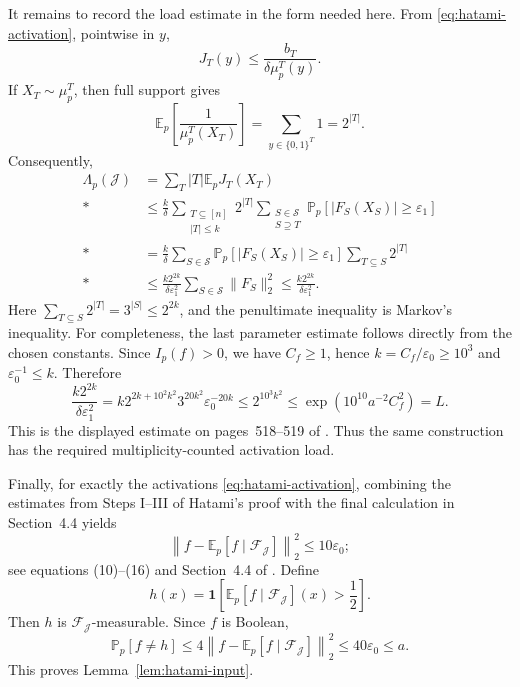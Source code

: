 \documentclass[11pt,letterpaper]{article}
\theoremstyle{definition}
\theoremstyle{remark}
\newcommand{\bits}{\{0,1\}}
\newcommand{\E}{\mathbb E}
\renewcommand{\Pr}{\mathbb P}
\newcommand{\one}{\mathbf 1}
\newcommand{\cF}{\mathcal F}
\newcommand{\cJ}{\mathcal J}
\newcommand{\cS}{\mathcal S}
\begin{document}
It remains to record the load estimate in the form needed here.  From
\eqref{eq:hatami-activation}, pointwise in $y$,
\[
       J_T(y)\le\frac{b_T}{\delta\mu_p^T(y)}.
\]
If $X_T\sim\mu_p^T$, then full support gives
\[
       \E_p\left[\frac1{\mu_p^T(X_T)}\right]
       =\sum_{y\in\bits^T}1=2^{|T|}.
\]
Consequently,
\begin{align*}
 \Lambda_p(\cJ)
 &=\sum_T |T|\E_pJ_T(X_T)\\*
 &\le \frac{k}{\delta}
      \sum_{\substack{T\subseteq[n]\\|T|\le k}}2^{|T|}
      \sum_{\substack{S\in\cS\\S\supseteq T}}
      \Pr_p[|F_S(X_S)|\ge\varepsilon_1]\\*
 &=\frac{k}{\delta}
      \sum_{S\in\cS}\Pr_p[|F_S(X_S)|\ge\varepsilon_1]
      \sum_{T\subseteq S}2^{|T|}\\*
 &\le\frac{k2^{2k}}{\delta\varepsilon_1^2}
      \sum_{S\in\cS}\|F_S\|_2^2
 \le\frac{k2^{2k}}{\delta\varepsilon_1^2}.
\end{align*}
Here $\sum_{T\subseteq S}2^{|T|}=3^{|S|}\le2^{2k}$, and the penultimate
inequality is Markov's inequality.  For completeness, the last parameter estimate follows directly from the
chosen constants.  Since $I_p(f)>0$, we have $C_f\ge1$, hence
$k=C_f/\varepsilon_0\ge10^3$ and $\varepsilon_0^{-1}\le k$.  Therefore
\[
 \frac{k2^{2k}}{\delta\varepsilon_1^2}
 =k2^{2k+10^2k^2}3^{20k^2}\varepsilon_0^{-20k}
 \le2^{10^3k^2}
 \le\exp\!\left(10^{10}a^{-2}C_f^2\right)=L.
\]
This is the displayed estimate on pages~518--519 of \cite{Hatami2012}.
Thus the same construction has the required multiplicity-counted activation
load.

Finally, for exactly the activations \eqref{eq:hatami-activation}, combining
the estimates from Steps I--III of Hatami's proof with the final calculation in
Section~4.4 yields
\[
       \left\|f-\E_p[f\mid\cF_{\cJ}]\right\|_2^2
       \le10\varepsilon_0;
\]
see equations (10)--(16) and Section~4.4 of \cite{Hatami2012}.  Define
\[
       h(x)=\one\!\left[
          \E_p[f\mid\cF_{\cJ}](x)>\frac12
       \right].
\]
Then $h$ is $\cF_{\cJ}$-measurable.  Since $f$ is Boolean,
\[
       \Pr_p[f\ne h]
       \le4\left\|f-\E_p[f\mid\cF_{\cJ}]\right\|_2^2
       \le40\varepsilon_0\le a.
\]
This proves Lemma~\ref{lem:hatami-input}.
\end{document}
